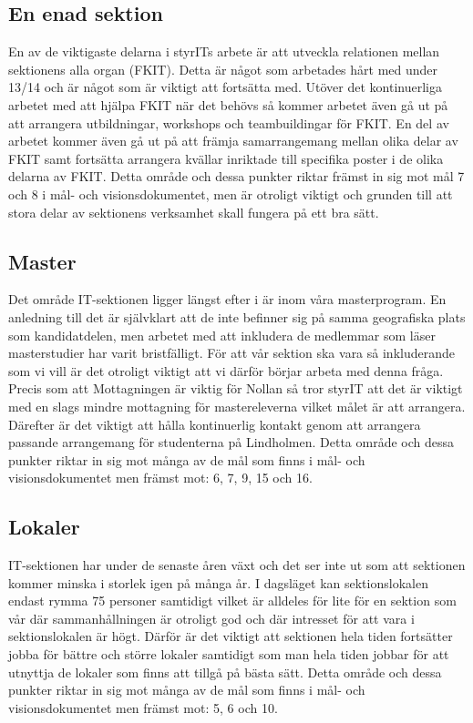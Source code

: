 \documentclass[11pt, includeaddress]{../../classes/cthit}
\begin{document}
\subsection{En enad sektion}
En av de viktigaste delarna i styrITs arbete är att utveckla relationen mellan sektionens alla organ (FKIT). Detta är något som arbetades hårt med under 13/14 och är något som är viktigt att fortsätta med. Utöver det kontinuerliga arbetet med att hjälpa FKIT när det behövs så kommer arbetet även gå ut på att arrangera utbildningar, workshops och teambuildingar för FKIT. En del av arbetet kommer även gå ut på att främja samarrangemang mellan olika delar av FKIT samt fortsätta arrangera kvällar inriktade till specifika poster i de olika delarna av FKIT.
\newline
\newline
Detta område och dessa punkter riktar främst in sig mot mål 7 och 8 i mål- och visionsdokumentet, men är otroligt viktigt och grunden till att stora delar av sektionens verksamhet skall fungera på ett bra sätt.

\subsection{Master}
Det område IT-sektionen ligger längst efter i är inom våra masterprogram. En anledning till det är självklart att de inte befinner sig på samma geografiska plats som kandidatdelen, men arbetet med att inkludera de medlemmar som läser masterstudier har varit bristfälligt. För att vår sektion ska vara så inkluderande som vi vill är det otroligt viktigt att vi därför börjar arbeta med denna fråga. Precis som att Mottagningen är viktig för Nollan så tror styrIT att det är viktigt med en slags mindre mottagning för mastereleverna vilket målet är att arrangera. Därefter är det viktigt att hålla kontinuerlig kontakt genom att arrangera passande arrangemang för studenterna på Lindholmen.
\newline
\newline
Detta område och dessa punkter riktar in sig mot många av de mål som finns i mål- och visionsdokumentet men främst mot: 6, 7, 9, 15 och 16.

\subsection{Lokaler}
IT-sektionen har under de senaste åren växt och det ser inte ut som att sektionen kommer minska i storlek igen på många år. I dagsläget kan sektionslokalen endast rymma 75 personer samtidigt vilket är alldeles för lite för en sektion som vår där sammanhållningen är otroligt god och där intresset för att vara i sektionslokalen är högt. Därför är det viktigt att sektionen hela tiden fortsätter jobba för bättre och större lokaler samtidigt som man hela tiden jobbar för att utnyttja de lokaler som finns att tillgå på bästa sätt.
\newline
\newline
Detta område och dessa punkter riktar in sig mot många av de mål som finns i mål- och visionsdokumentet men främst mot: 5, 6 och 10.
\end{document}
